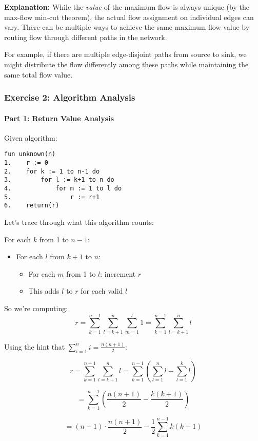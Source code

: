 \documentclass{article}
\begin{document}
\textbf{Explanation:} While the \emph{value} of the maximum flow is always unique (by the max-flow min-cut theorem), the actual flow assignment on individual edges can vary. There can be multiple ways to achieve the same maximum flow value by routing flow through different paths in the network.

For example, if there are multiple edge-disjoint paths from source to sink, we might distribute the flow differently among these paths while maintaining the same total flow value.

\subsubsection{Exercise 2: Algorithm Analysis}

\paragraph{Part 1: Return Value Analysis}

Given algorithm:
\begin{verbatim}
fun unknown(n)
1.    r := 0
2.    for k := 1 to n-1 do
3.        for l := k+1 to n do
4.            for m := 1 to l do
5.                r := r+1
6.    return(r)
\end{verbatim}

Let's trace through what this algorithm counts:

For each $k$ from 1 to $n-1$:
\begin{itemize}
    \item For each $l$ from $k+1$ to $n$:
    \begin{itemize}
        \item For each $m$ from 1 to $l$: increment $r$
        \item This adds $l$ to $r$ for each valid $l$
    \end{itemize}
\end{itemize}

So we're computing:
$$r = \sum_{k=1}^{n-1} \sum_{l=k+1}^{n} \sum_{m=1}^{l} 1 = \sum_{k=1}^{n-1} \sum_{l=k+1}^{n} l$$

Using the hint that $\sum_{i=1}^{n} i = \frac{n(n+1)}{2}$:

$$r = \sum_{k=1}^{n-1} \sum_{l=k+1}^{n} l = \sum_{k=1}^{n-1} \left(\sum_{l=1}^{n} l - \sum_{l=1}^{k} l\right)$$

$$= \sum_{k=1}^{n-1} \left(\frac{n(n+1)}{2} - \frac{k(k+1)}{2}\right)$$

$$= (n-1) \cdot \frac{n(n+1)}{2} - \frac{1}{2}\sum_{k=1}^{n-1} k(k+1)$$
\end{document}
